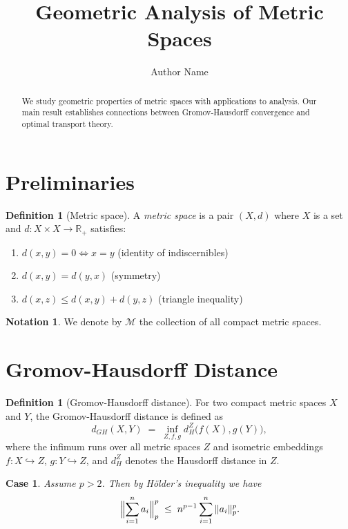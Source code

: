 \documentclass[reqno]{amsart}
\title{Geometric Analysis of Metric Spaces}
\author{Author Name}
\theoremstyle{plain}
\newtheorem{case}{Case}
\theoremstyle{definition}
\newtheorem{definition}[theorem]{Definition}
\newtheorem{notation}[theorem]{Notation}
\theoremstyle{note}
\theoremstyle{Proof}
\begin{document}
\maketitle

\begin{abstract}
We study geometric properties of metric spaces with applications to analysis.
Our main result establishes connections between Gromov-Hausdorff convergence
and optimal transport theory.
\end{abstract}

\section{Preliminaries}

\begin{definition}[Metric space]
\label{def:metric}
A \emph{metric space} is a pair $(X,d)$ where $X$ is a set and
$d:X\times X\to\mathbb{R}_+$ satisfies:
\begin{enumerate}
  \item $d(x,y)=0 \iff x=y$ (identity of indiscernibles)
  \item $d(x,y)=d(y,x)$ (symmetry)
  \item $d(x,z)\le d(x,y)+d(y,z)$ (triangle inequality)
\end{enumerate}
\end{definition}

\begin{notation}
We denote by $\mathcal{M}$ the collection of all compact metric spaces.
\end{notation}

\section{Gromov-Hausdorff Distance}

\begin{definition}[Gromov-Hausdorff distance]
\label{def:gh}
For two compact metric spaces $X$ and $Y$, the Gromov-Hausdorff distance
is defined as
\[
  d_{GH}(X,Y) \;=\; \inf_{Z,f,g} d_H^Z\bigl(f(X),g(Y)\bigr),
\]
where the infimum runs over all metric spaces $Z$ and isometric embeddings
$f:X\hookrightarrow Z$, $g:Y\hookrightarrow Z$, and $d_H^Z$ denotes the
Hausdorff distance in $Z$.
\end{definition}

\begin{case}
Assume $p > 2$. Then by H\"older's inequality we have
\[
  \Bigl\|\sum_{i=1}^n a_i\Bigr\|_p^p
  \;\le\; n^{p-1}\sum_{i=1}^n \|a_i\|_p^p .
\]
\end{case}
\end{document}
